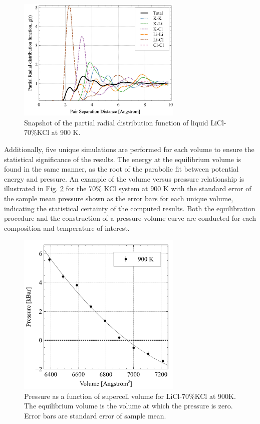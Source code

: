 \documentclass[review]{elsarticle}
\begin{document}
 \begin{figure}[h]
 \centering
 \includegraphics[width=0.7\textwidth]{images/Partial_RDF.jpg} \caption{Snapshot of the partial radial distribution function of liquid LiCl-70\%KCl at 900 K.}
 \label{fig:rdf}
 \end{figure}
 Additionally, five unique simulations are performed for each volume to ensure the statistical significance of the results. The energy at the equilibrium volume is found in the same manner, as the root of the parabolic fit between potential energy and pressure. An example of the volume versus pressure relationship is illustrated in Fig. \ref{fig:VvsP} for the 70\% KCl system at 900 K with the standard error of the sample mean pressure shown as the error bars for each unique volume, indicating the statistical certainty of the computed results. Both the equilibration procedure and the construction of a pressure-volume curve are conducted for each composition and temperature of interest.

 \begin{figure}[h]
 \centering
 \includegraphics[width=0.7\textwidth]{images/PressureVsVolume.jpg} 
 \caption{Pressure as a function of supercell volume for LiCl-70\%KCl at 900K. The equilibrium volume is the volume at which the pressure is zero. Error bars are standard error of sample mean.}
 \label{fig:VvsP}
\end{figure}
\end{document}
